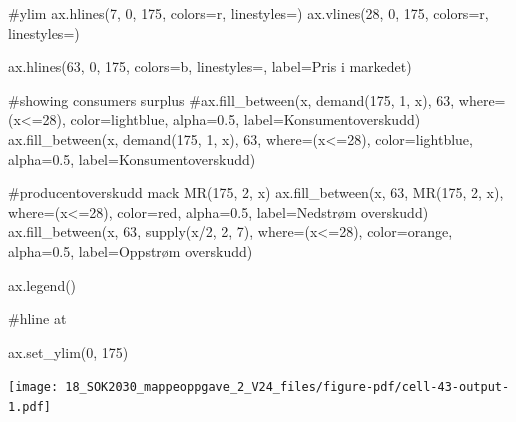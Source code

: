 \documentclass[
  12pt,
  a4paper,
  DIV=11,
  numbers=noendperiod]{scrartcl}
\newenvironment{Shaded}{\begin{snugshade}}{\end{snugshade}}
\newcommand{\CommentTok}[1]{\textcolor[rgb]{0.37,0.37,0.37}{#1}}
\newcommand{\DecValTok}[1]{\textcolor[rgb]{0.68,0.00,0.00}{#1}}
\newcommand{\FloatTok}[1]{\textcolor[rgb]{0.68,0.00,0.00}{#1}}
\newcommand{\NormalTok}[1]{\textcolor[rgb]{0.00,0.23,0.31}{#1}}
\newcommand{\OperatorTok}[1]{\textcolor[rgb]{0.37,0.37,0.37}{#1}}
\newcommand{\StringTok}[1]{\textcolor[rgb]{0.13,0.47,0.30}{#1}}
\begin{document}
\begin{Shaded}
\begin{Highlighting}[]
\CommentTok{\#ylim}
\NormalTok{ax.hlines(}\DecValTok{7}\NormalTok{, }\DecValTok{0}\NormalTok{, }\DecValTok{175}\NormalTok{, colors}\OperatorTok{=}\StringTok{\textquotesingle{}r\textquotesingle{}}\NormalTok{, linestyles}\OperatorTok{=}\StringTok{\textquotesingle{}{-}{-}\textquotesingle{}}\NormalTok{)}
\NormalTok{ax.vlines(}\DecValTok{28}\NormalTok{, }\DecValTok{0}\NormalTok{, }\DecValTok{175}\NormalTok{, colors}\OperatorTok{=}\StringTok{\textquotesingle{}r\textquotesingle{}}\NormalTok{, linestyles}\OperatorTok{=}\StringTok{\textquotesingle{}{-}{-}\textquotesingle{}}\NormalTok{)}



\NormalTok{ax.hlines(}\DecValTok{63}\NormalTok{, }\DecValTok{0}\NormalTok{, }\DecValTok{175}\NormalTok{, colors}\OperatorTok{=}\StringTok{\textquotesingle{}b\textquotesingle{}}\NormalTok{, linestyles}\OperatorTok{=}\StringTok{\textquotesingle{}{-}{-}\textquotesingle{}}\NormalTok{, label}\OperatorTok{=}\StringTok{\textquotesingle{}Pris i markedet\textquotesingle{}}\NormalTok{)}

\CommentTok{\#showing consumers surplus}
\CommentTok{\#ax.fill\_between(x, demand(175, 1, x), 63, where=(x\textless{}=28), color=\textquotesingle{}lightblue\textquotesingle{}, alpha=0.5, label=\textquotesingle{}Konsumentoverskudd\textquotesingle{})}
\NormalTok{ax.fill\_between(x, demand(}\DecValTok{175}\NormalTok{, }\DecValTok{1}\NormalTok{, x), }\DecValTok{63}\NormalTok{, where}\OperatorTok{=}\NormalTok{(x}\OperatorTok{\textless{}=}\DecValTok{28}\NormalTok{), color}\OperatorTok{=}\StringTok{\textquotesingle{}lightblue\textquotesingle{}}\NormalTok{, alpha}\OperatorTok{=}\FloatTok{0.5}\NormalTok{, label}\OperatorTok{=}\StringTok{\textquotesingle{}Konsumentoverskudd\textquotesingle{}}\NormalTok{)}

\CommentTok{\#producentoverskudd mack MR(175, 2, x)}
\NormalTok{ax.fill\_between(x, }\DecValTok{63}\NormalTok{, MR(}\DecValTok{175}\NormalTok{, }\DecValTok{2}\NormalTok{, x), where}\OperatorTok{=}\NormalTok{(x}\OperatorTok{\textless{}=}\DecValTok{28}\NormalTok{), color}\OperatorTok{=}\StringTok{\textquotesingle{}red\textquotesingle{}}\NormalTok{, alpha}\OperatorTok{=}\FloatTok{0.5}\NormalTok{, label}\OperatorTok{=}\StringTok{\textquotesingle{}Nedstrøm overskudd\textquotesingle{}}\NormalTok{)}
\NormalTok{ax.fill\_between(x, }\DecValTok{63}\NormalTok{, supply(x}\OperatorTok{/}\DecValTok{2}\NormalTok{, }\DecValTok{2}\NormalTok{, }\DecValTok{7}\NormalTok{), where}\OperatorTok{=}\NormalTok{(x}\OperatorTok{\textless{}=}\DecValTok{28}\NormalTok{), color}\OperatorTok{=}\StringTok{\textquotesingle{}orange\textquotesingle{}}\NormalTok{, alpha}\OperatorTok{=}\FloatTok{0.5}\NormalTok{, label}\OperatorTok{=}\StringTok{\textquotesingle{}Oppstrøm overskudd\textquotesingle{}}\NormalTok{)}

\NormalTok{ax.legend()}

\CommentTok{\#hline at }

\NormalTok{ax.set\_ylim(}\DecValTok{0}\NormalTok{, }\DecValTok{175}\NormalTok{)}
\end{Highlighting}
\end{Shaded}

\texttt{[image: 18\_SOK2030\_mappeoppgave\_2\_V24\_files/figure-pdf/cell-43-output-1.pdf]}
\end{document}
